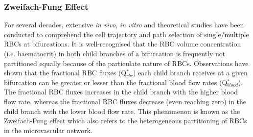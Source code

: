 \subsubsection{Zweifach-Fung Effect}
\noindent For several decades, extensive \textit{in vivo}\cite{FungYuan-Cheng1973Sfic, SVANES1968210, PRIES198981}, \textit{in vitro}\cite{Bugliarello469, Roberts2003, Roberts2006, doyeux_podgorski_peponas_ismail_coupier_2011, Zhou2021EmergentBifurcations}  and theoretical\cite{PriesA.R1996Baob, PriesAR1990BFiM, YAN199117, Balogh2018, Freund2014, wang_sui_salsac_barthes-biesel_wang_2016, wang_sui_salsac_barthes-biesel_wang_2018, Barber2011SimulatedPartitioning, Xiong2012Two-dimensionalEffects, 2020Charles} studies have been conducted to comprehend the cell trajectory and path selection of single/multiple RBCs at bifurcations. It is well-recognised that the RBC volume concentration (i.e. haematocrit) in both child branches of a bifurcation is frequently not partitioned equally because of the particulate nature of RBCs. Observations have shown that the fractional RBC fluxes (Q$^{*}_{rbc}$) each child branch receives at a given bifurcation can be greater or lesser than the fractional blood flow rates (Q$^{*}_{blood}$).\cite{Liu2020HeterogeneousBifurcations, doyeux_podgorski_peponas_ismail_coupier_2011, PriesA.R1996Baob, LIPOWSKY1977345} The fractional RBC fluxes increases in the child branch with the higher blood flow rate, whereas the fractional RBC fluxes decrease (even reaching zero) in the child branch with the lower blood flow rate. This phenomenon is known as the Zweifach-Fung effect\cite{SVANES1968210} which also refers to the heterogeneous partitioning of RBCs in the microvascular network. \\

